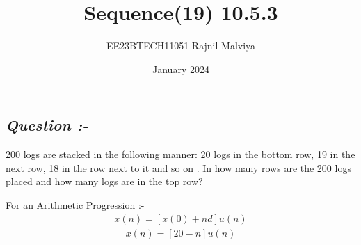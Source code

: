 \documentclass[journal,12pt,twocolumn]{IEEEtran}
\theoremstyle{remark}
\begin{document}
\title{Sequence(19) 10.5.3}
\author{EE23BTECH11051-Rajnil Malviya}
\date{January 2024}
\maketitle
\subsection*{\textit{Question :-}}
200 logs are stacked in the following manner: 20 logs in the bottom row, 19 in the next row,
18 in the row next to it and so on . In how many rows are the 200 logs placed
and how many logs are in the top row?

\begin{table}[h!]
   
        
       
    \end{table}
For an Arithmetic Progression :-
\begin{align}x(n)=[x(0)+n d]u(n)\end{align}
\begin{align}x(n)=[20-n]u(n)\end{align}
\end{document}

